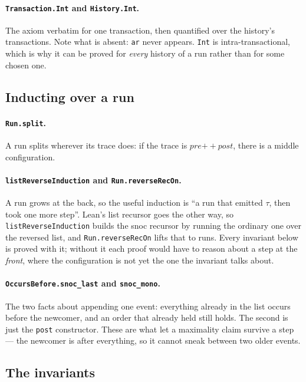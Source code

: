 \documentclass[11pt]{article}
\newcommand{\lean}[1]{\texttt{\small #1}}
\begin{document}
\paragraph{\lean{Transaction.Int} and \lean{History.Int}.}
The axiom verbatim for one transaction, then quantified over the history's
transactions. Note what is absent: \lean{ar} never appears. \lean{Int} is
intra-transactional, which is why it can be proved for \emph{every} history of a
run rather than for some chosen one.

\subsection{Inducting over a run}

\paragraph{\lean{Run.split}.}
A run splits wherever its trace does: if the trace is $\mathit{pre} \mathbin{+\!\!+}
\mathit{post}$, there is a middle configuration.

\paragraph{\lean{listReverseInduction} and \lean{Run.reverseRecOn}.}
A run grows at the back, so the useful induction is ``a run that emitted $\tau$,
then took one more step''. Lean's list recursor goes the other way, so
\lean{listReverseInduction} builds the snoc recursor by running the ordinary one
over the reversed list, and \lean{Run.reverseRecOn} lifts that to runs. Every
invariant below is proved with it; without it each proof would have to reason
about a step at the \emph{front}, where the configuration is not yet the one the
invariant talks about.

\paragraph{\lean{OccursBefore.snoc\_last} and \lean{snoc\_mono}.}
The two facts about appending one event: everything already in the list occurs
before the newcomer, and an order that already held still holds. The second is
just the \lean{post} constructor. These are what let a maximality claim survive a
step --- the newcomer is after everything, so it cannot sneak between two older
events.

\subsection{The invariants}
\end{document}
